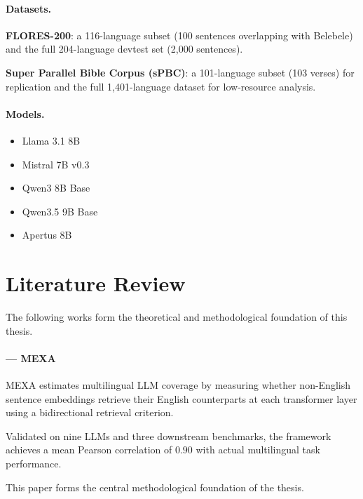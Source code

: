 \documentclass{article}
\begin{document}
\paragraph{Datasets.}

\textbf{FLORES-200}: a 116-language subset
(100 sentences overlapping with Belebele)
and the full 204-language devtest set
(2,000 sentences).

\textbf{Super Parallel Bible Corpus (sPBC)}:
a 101-language subset (103 verses) for replication
and the full 1,401-language dataset for low-resource analysis.

\paragraph{Models.}

\begin{itemize}
    \item Llama 3.1 8B
    \item Mistral 7B v0.3
    \item Qwen3 8B Base
    \item Qwen3.5 9B Base
    \item Apertus 8B
\end{itemize}


\section{Literature Review}
\label{sec:literature_review}

The following works form the theoretical and methodological foundation
of this thesis.

\paragraph{\citet{kargaran2025mexa} --- MEXA}

MEXA estimates multilingual LLM coverage by measuring whether
non-English sentence embeddings retrieve their English counterparts
at each transformer layer using a bidirectional retrieval criterion.

Validated on nine LLMs and three downstream benchmarks,
the framework achieves a mean Pearson correlation of $0.90$
with actual multilingual task performance.

This paper forms the central methodological foundation of the thesis.
\end{document}
